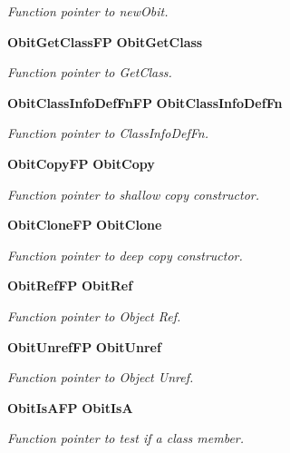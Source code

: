 \begin{CompactItemize}
\begin{CompactList}\small\item\em Function pointer to new\-Obit. \item\end{CompactList}\item 
{\bf Obit\-Get\-Class\-FP} {\bf Obit\-Get\-Class}
\begin{CompactList}\small\item\em Function pointer to Get\-Class. \item\end{CompactList}\item 
{\bf Obit\-Class\-Info\-Def\-Fn\-FP} {\bf Obit\-Class\-Info\-Def\-Fn}
\begin{CompactList}\small\item\em Function pointer to Class\-Info\-Def\-Fn. \item\end{CompactList}\item 
{\bf Obit\-Copy\-FP} {\bf Obit\-Copy}
\begin{CompactList}\small\item\em Function pointer to shallow copy constructor. \item\end{CompactList}\item 
{\bf Obit\-Clone\-FP} {\bf Obit\-Clone}
\begin{CompactList}\small\item\em Function pointer to deep copy constructor. \item\end{CompactList}\item 
{\bf Obit\-Ref\-FP} {\bf Obit\-Ref}
\begin{CompactList}\small\item\em Function pointer to Object Ref. \item\end{CompactList}\item 
{\bf Obit\-Unref\-FP} {\bf Obit\-Unref}
\begin{CompactList}\small\item\em Function pointer to Object Unref. \item\end{CompactList}\item 
{\bf Obit\-Is\-AFP} {\bf Obit\-Is\-A}
\begin{CompactList}\small\item\em Function pointer to test if a class member. \item\end{CompactList}\item 

\end{CompactItemize}

